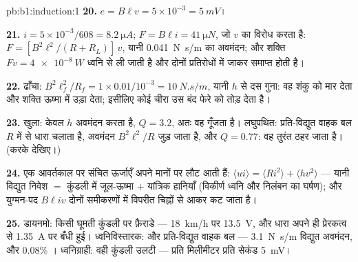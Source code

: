 \begin{solution}{pb:b1:induction:1}
\textbf{20.} $e = B\ell v = 5 \times 10^{-3} = \qty{5}{mV}$।

\textbf{21.} $i = 5 \times 10^{-3}/608 = \qty{8.2}{\micro A}$; $F = B\ell i = \qty{41}{\micro N}$,
जो $v$ का विरोध करता है: $F = [B^2\ell^2/(R + R_L)]\,v$, यानी \qty{0.041}{N.s/m} का
अवमंदन; और शक्ति $Fv = \qty{4e-8}{W}$ ध्वनि से ली जाती है और दोनों
प्रतिरोधों में जाकर समाप्त होती है।

\textbf{22.} ढाँचा: $B^2\ell_f^2/R_f = 1 \times 0.01/10^{-3} = \qty{10}{N.s/m}$, यानी
$h$ से दस गुना: वह शंकु को मार देता और शक्ति ऊष्मा में उड़ा देता; इसीलिए
कोई चीरा उस बंद फेरे को तोड़ देता है।

\textbf{23.} खुला: केवल $h$ अवमंदन करता है, $Q = 3.2$, अतः वह गूँजता है।
लघुपथित: प्रति-विद्युत वाहक बल $R$ में से धारा चलाता है, अवमंदन
$B^2\ell^2/R$ जुड़ जाता है, और $Q = 0.77$: वह तुरंत ठहर जाता है। (करके देखिए।)

\textbf{24.} एक आवर्तकाल पर संचित ऊर्जाएँ अपने मानों पर लौट आती हैं:
$\langle ui\rangle = \langle Ri^2\rangle + \langle hv^2\rangle$ --- यानी विद्युत निवेश $=$
कुंडली में जूल-ऊष्मा $+$ यांत्रिक हानियाँ (विकीर्ण ध्वनि और निलंबन का
घर्षण); और युग्मन-पद $B\ell iv$ दोनों समीकरणों में विपरीत चिह्नों से आकर कट
जाता है।

\textbf{25.} डायनमो: किसी घूमती कुंडली पर फ़ैराडे --- \qty{18}{km/h} पर
\qty{13.5}{V}, और धारा अपने ही प्रेरकत्व से \qty{1.35}{A} पर बँधी हुई।
ध्वनिविस्तारक:  और प्रति-विद्युत वाहक बल --- \qty{3.1}{N.s/m}
विद्युत अवमंदन, और $0.08\%$ । ध्वनिग्राही: वही कुंडली उलटी ---
प्रति मिलीमीटर प्रति सेकंड \qty{5}{mV}।
\end{solution}
